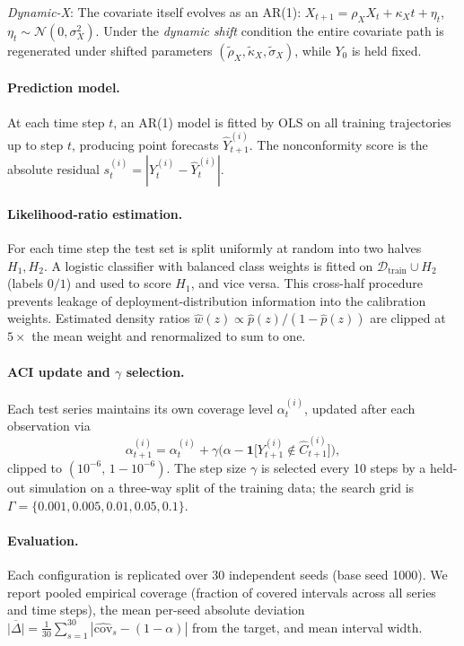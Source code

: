 \textit{Dynamic-X}: The covariate itself evolves as an AR(1):
$X_{t+1} = \rho_X X_t + \kappa_X t + \eta_t$, $\eta_t \sim \mathcal{N}(0,
\sigma_X^2)$.  Under the \emph{dynamic shift} condition the entire covariate
path is regenerated under shifted parameters $(\tilde\rho_X, \tilde\kappa_X,
\tilde\sigma_X)$, while $Y_0$ is held fixed.

\paragraph{Prediction model.}
At each time step $t$, an AR(1) model is fitted by OLS on all training
trajectories up to step $t$, producing point forecasts $\hat Y_{t+1}^{(i)}$.
The nonconformity score is the absolute residual
$s_t^{(i)} = |Y_t^{(i)} - \hat Y_t^{(i)}|$.

\paragraph{Likelihood-ratio estimation.}
For each time step the test set is split uniformly at random into two halves
$H_1, H_2$.  A logistic classifier with balanced class weights is fitted on
$\mathcal{D}_{\mathrm{train}} \cup H_2$ (labels $0/1$) and used to score
$H_1$, and vice versa.  This cross-half procedure prevents leakage of
deployment-distribution information into the calibration weights.
Estimated density ratios $\hat w(z) \propto \hat p(z) / (1 - \hat p(z))$ are
clipped at $5\times$ the mean weight and renormalized to sum to one.

\paragraph{ACI update and $\gamma$ selection.}
Each test series maintains its own coverage level $\alpha_t^{(i)}$, updated
after each observation via
%
\[
  \alpha_{t+1}^{(i)} = \alpha_t^{(i)}
    + \gamma \bigl(\alpha - \mathbf{1}\bigl[Y_{t+1}^{(i)} \notin
      \hat C_{t+1}^{(i)}\bigr]\bigr),
\]
%
clipped to $(10^{-6},\, 1 - 10^{-6})$.  The step size $\gamma$ is selected
every 10 steps by a held-out simulation on a three-way split of the training
data; the search grid is $\Gamma = \{0.001, 0.005, 0.01, 0.05, 0.1\}$.

\paragraph{Evaluation.}
Each configuration is replicated over 30 independent seeds (base seed 1000).
We report pooled empirical coverage (fraction of covered intervals across all
series and time steps), the mean per-seed absolute deviation
$\overline{|\Delta|} = \frac{1}{30}\sum_{s=1}^{30}
|\hat{\mathrm{cov}}_s - (1-\alpha)|$ from the target, and mean interval
width.

